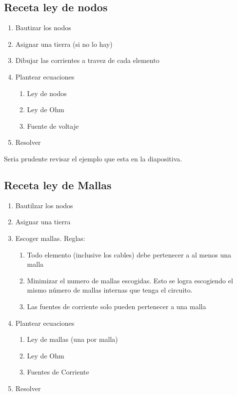 \documentclass{report}
\begin{document}
\subsection{Receta ley de nodos}
\begin{enumerate}
  \item Bautizar los nodos
  \item Asignar una tierra (si no lo hay)
  \item Dibujar las corrientes a travez de cada elemento
  \item Plantear ecuaciones
    \begin{enumerate}
      \item Ley de nodos
      \item Ley de Ohm
      \item Fuente de voltaje
    \end{enumerate}
  \item Resolver
\end{enumerate}

Seria prudente revisar el ejemplo que esta en la diapositiva.
\subsection{Receta ley de Mallas}
\begin{enumerate}
  \item Bautilzar los nodos
  \item Asignar una tierra
  \item Escoger mallas. Reglas:
    \begin{enumerate}
      \item Todo elemento (inclusive los cables) debe pertenecer a al menos una malla
      \item Minimizar el numero de mallas escogidas. Esto se logra escogiendo el mismo número de mallas internas que tenga el circuito.
      \item Las fuentes de corriente solo pueden pertenecer a una malla
    \end{enumerate}
  \item Plantear ecuaciones
    \begin{enumerate}
      \item Ley de mallas (una por malla)
      \item Ley de Ohm
      \item Fuentes de Corriente
    \end{enumerate}
  \item Resolver
\end{enumerate}
\end{document}
